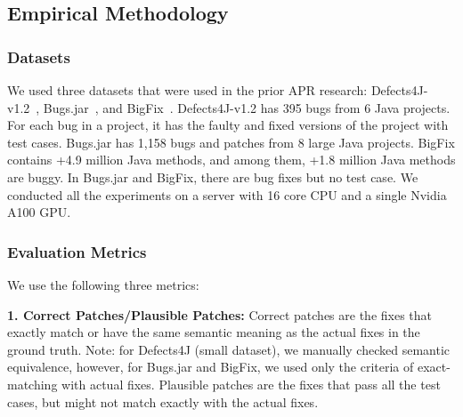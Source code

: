 \subsection{Empirical Methodology}

\subsubsection{Datasets}
We used three datasets that were used in the prior APR research:
Defects4J-v1.2~\cite{defects4j}, Bugs.jar~\cite{saha2018bugs}, and
BigFix~\cite{yioopsla19}. Defects4J-v1.2 has 395 bugs from 6 Java
projects. For each bug in a project, it has the faulty and fixed
versions of the project with test cases. Bugs.jar has 1,158 bugs and
patches from 8 large Java projects. BigFix contains +4.9
million Java methods, and among them, +1.8 million Java methods are
buggy. In Bugs.jar and BigFix, there are bug fixes but no test
case. We conducted all the experiments on a server with 16 core CPU
and a single Nvidia A100 GPU.


\subsubsection{Evaluation Metrics}

We use the following three metrics:


{\bf 1. Correct Patches/Plausible Patches:} Correct patches are the
fixes that exactly match or have the same semantic meaning as the
actual fixes in the ground truth. Note: for Defects4J (small dataset),
we manually checked semantic equivalence, however, for Bugs.jar and
BigFix, we used only the criteria of exact-matching with actual fixes.
%
Plausible patches are the fixes that pass all the test cases, but
might not match exactly with the actual fixes.

